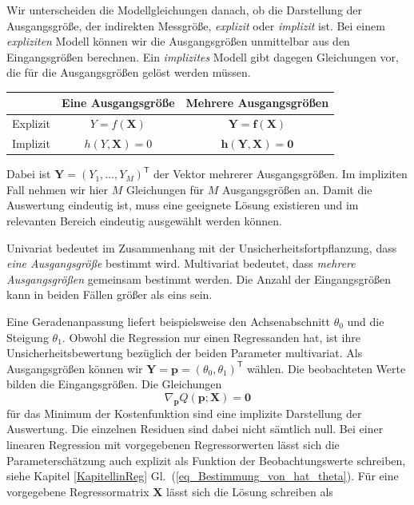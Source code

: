 Wir unterscheiden die Modellgleichungen danach, ob die Darstellung der Ausgangsgröße, der indirekten Messgröße, \textsl{explizit} oder \textsl{implizit} ist. 
Bei einem \textsl{expliziten} Modell können wir die Ausgangsgrößen unmittelbar
aus den Eingangsgrößen berechnen. Ein \textsl{implizites} Modell gibt dagegen
Gleichungen vor, die für die Ausgangsgrößen gelöst werden müssen.
\begin{center}
\renewcommand{\arraystretch}{1.6}
\begin{tabular}{l|c|c}
 & Eine Ausgangsgröße & Mehrere Ausgangsgrößen\\
\hline
Explizit & $Y=f(\mathbf X)$ & $\mathbf Y=\mathbf f(\mathbf X)$\\
Implizit & $h(Y,\mathbf X)=0$ & $\mathbf h(\mathbf Y,\mathbf X)=\mathbf 0$
\end{tabular}
\end{center}
Dabei ist $\mathbf Y=(Y_1,\dots,Y_M)^\mathsf T$ der Vektor mehrerer Ausgangsgrößen. Im impliziten Fall nehmen
wir hier $M$ Gleichungen für $M$ Ausgangsgrößen an. Damit die Auswertung
eindeutig ist, muss eine geeignete Lösung existieren und im relevanten
Bereich eindeutig ausgewählt werden können.

\glqq Univariat\grqq{} bedeutet im Zusammenhang mit der
Unsicherheitsfortpflanzung, dass \emph{eine Ausgangsgröße} bestimmt wird.
\glqq Multivariat\grqq{} bedeutet, dass \emph{mehrere Ausgangsgrößen}
gemeinsam bestimmt werden. Die Anzahl der Eingangsgrößen kann in beiden
Fällen größer als eins sein.

Eine Geradenanpassung liefert beispielsweise den Achsenabschnitt $\theta_0$ und die Steigung $\theta_1$. 
Obwohl die Regression nur einen Regressanden hat, ist ihre
Unsicherheitsbewertung bezüglich der beiden Parameter multivariat. Als
Ausgangsgrößen können wir $\mathbf Y=\mathbf p=(\theta_0,\theta_1)^\mathsf T$ wählen.
Die beobachteten Werte bilden die Eingangsgrößen. Die Gleichungen
\begin{equation}
\nabla_{\mathbf p}Q(\mathbf p;\mathbf X)=\mathbf 0
\label{implizitMultivariatRegre}
\end{equation}
für das Minimum der Kostenfunktion sind eine implizite Darstellung der
Auswertung. Die einzelnen Residuen sind dabei nicht sämtlich null. Bei einer
linearen Regression mit vorgegebenen Regressorwerten lässt sich die
Parameterschätzung auch explizit als Funktion der Beobachtungswerte schreiben, siehe Kapitel \ref{KapitellinReg} Gl.\ (\ref{eq_Bestimmung_von_hat_theta}).
Für eine vorgegebene Regressormatrix $\mathbf X$ lässt sich die Lösung schreiben als


